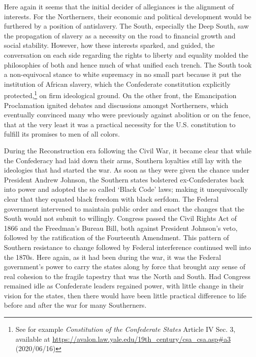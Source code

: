 \documentclass[a4paper]{article}
\begin{document}
Here again it seems that the initial decider of allegiances is the alignment of interests. For the Northerners, their economic and political development would be furthered by a position of antislavery. The South, especially the Deep South, saw the propagation of slavery as a necessity on the road to financial growth and social stability. However, how these interests sparked, and guided, the conversation on each side regarding the rights to liberty and equality molded the philosophies of both and hence much of what unified each trench. The South took a non-equivocal stance to white supremacy in no small part because it put the institution of African slavery, which the Confederate constitution explicitly protected,\footnote{See for example \textit{Constitution of the Confederate States} Article IV Sec. 3, available at \url{https://avalon.law.yale.edu/19th_century/csa_csa.asp#a3} (2020/06/16)} on firm ideological ground. On the other front, the Emancipation Proclamation ignited  debates and discussions amongst Northerners, which eventually convinced many who were previously against abolition or on the fence, that at the very least it was a practical necessity for the U.S. constitution to fulfill its promises to men of all colors.

During the Reconstruction era following the Civil War, it became clear that while the Confederacy had laid down their arms, Southern loyalties still lay with the ideologies that had started the war. As soon as they were given the chance under President Andrew Johnson, the Southern states bolstered ex-Confederates back into power and adopted the so called ‘Black Code’ laws; making it unequivocally clear that they equated black freedom with black serfdom. The Federal government intervened to maintain public order and enact the changes that the South would not submit to willingly. Congress passed the Civil Rights Act of 1866 and the Freedman’s Bureau Bill, both against President Johnson's veto, followed by the ratification of the Fourteenth Amendment. This pattern of Southern resistance to change followed by Federal interference continued well into the 1870s.\autocite[pp. 531-559]{AmericanRep1} Here again, as it had been during the war, it was the Federal government’s power to carry the states along by force that brought any sense of real cohesion to the fragile tapestry that was the North and South. Had Congress remained idle as Confederate leaders regained power, with little change in their vision for the states, then there would have been little practical difference to life before and after the war for many Southerners.
\end{document}
